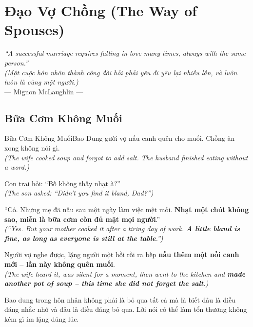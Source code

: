 \chapter{Đạo Vợ Chồng (The Way of Spouses)}

\begin{center}
  \textit{\color{truyenblue}``A successful marriage requires falling in love many times, always with the same person.''}\\
  \textit{(Một cuộc hôn nhân thành công đòi hỏi phải yêu đi yêu lại nhiều lần, và luôn luôn là cùng một người.)}\\[4pt]
  \small\color{truyengold}--- Mignon McLaughlin ---
\end{center}
\ngancach

\section{Bữa Cơm Không Muối}
\begin{truyen}{Bữa Cơm Không Muối}{Bao Dung}
gười vợ nấu canh quên cho muối. Chồng ăn xong không nói gì.\\
\textit{(The wife cooked soup and forgot to add salt. The husband finished eating without a word.)}

Con trai hỏi: ``Bố không thấy nhạt à?''\\
\textit{(The son asked: ``Didn't you find it bland, Dad?'')}

``Có. Nhưng mẹ đã nấu sau một ngày làm việc mệt mỏi. \textbf{Nhạt một chút không sao, miễn là bữa cơm còn đủ mặt mọi người}.''\\
\textit{(``Yes. But your mother cooked it after a tiring day of work. \textbf{A little bland is fine, as long as everyone is still at the table}.'')}

Người vợ nghe được, lặng người một hồi rồi ra bếp \textbf{nấu thêm một nồi canh mới – lần này không quên muối}.\\
\textit{(The wife heard it, was silent for a moment, then went to the kitchen and \textbf{made another pot of soup – this time she did not forget the salt}.)}
\end{truyen}
\begin{baihoc}
  Bao dung trong hôn nhân không phải là bỏ qua tất cả mà là biết đâu là điều đáng nhắc nhở và đâu là điều đáng bỏ qua. Lời nói có thể làm tổn thương không kém gì im lặng đúng lúc.
\end{baihoc}

